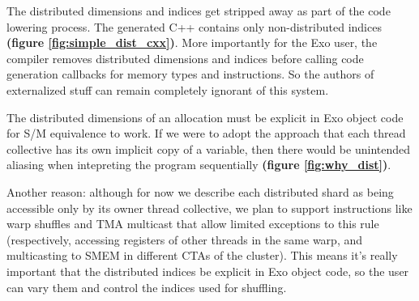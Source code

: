 \filbreak
{} The distributed dimensions and indices get stripped away as part of the code lowering process.
The generated C++ contains only non-distributed indices \textbf{(figure \ref{fig:simple_dist_cxx})}.
More importantly for the Exo user, the compiler removes distributed dimensions and indices before calling code generation callbacks for memory types and instructions.
So the authors of externalized stuff can remain completely ignorant of this system.

\begin{figure*}[!b]

\caption{Counterexample for S/M equivalence for a hypothetical design where variables are implicitly duplicated across threads. Note: in general we cannot fuse the  loops or sink the allocation of  into the loop scope, since there may be required synchronization or other convergent code between them.}
\label{fig:why_dist}
\end{figure*}

\filbreak
{} The distributed dimensions of an allocation must be explicit in Exo object code for S/M equivalence to work.
If we were to adopt the approach that each thread collective has its own implicit copy of a variable, then there would be unintended aliasing when intepreting the program sequentially \textbf{(figure \ref{fig:why_dist})}.

\filbreak
Another reason: although for now we describe each distributed shard as being accessible only by its owner thread collective, we plan to support instructions like warp shuffles and TMA multicast that allow limited exceptions to this rule (respectively, accessing registers of other threads in the same warp, and multicasting to SMEM in different CTAs of the cluster).
This means it's really important that the distributed indices be explicit in Exo object code, so the user can vary them and control the indices used for shuffling.

\filbreak
{}

\begin{figure*}[b!]

\caption{Synchronizing within a warp, and across warps}
\label{fig:sync_warp_cta}
\end{figure*}

\begin{figure*}[b!]

\caption{Synchronizing mixed synchronous and asynchronous instructions}
\label{fig:Sm80_cp_async_simple}
\end{figure*}

